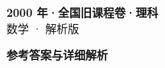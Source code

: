 \documentclass[zihao=-4, a4paper]{ctexart}
\begin{document}
\begin{center}
  {\Large\bfseries 2000 年·全国旧课程卷·理科}\\[4pt]
  {\large 数学 · 解析版}
\end{center}
\medskip
{}

\clearpage
{}
\begin{center}{\Large\bfseries 参考答案与详细解析}\end{center}
\medskip

\end{document}
